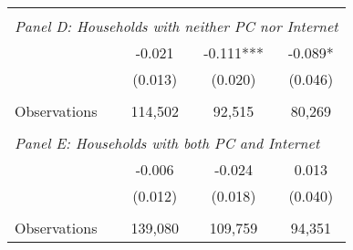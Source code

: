 {\begin{tabular}{lccc}
&  &  &   \\
\multicolumn{4}{l}{\textit{Panel D: Households with neither PC nor Internet}} \\
\hspace{3mm}        &      -0.021   &      -0.111***&      -0.089*  \\
                    &     (0.013)   &     (0.020)   &     (0.046)   \\
                    &               &               &               \\
\hspace{3mm}Observations&     114,502   &      92,515   &      80,269   \\
 
&  &  &   \\
\multicolumn{4}{l}{\textit{Panel E: Households with both PC and Internet}} \\
\hspace{3mm}        &      -0.006   &      -0.024   &       0.013   \\
                    &     (0.012)   &     (0.018)   &     (0.040)   \\
                    &               &               &               \\
\hspace{3mm}Observations&     139,080   &     109,759   &      94,351   \\
 

\bottomrule
\end{tabular}
}
